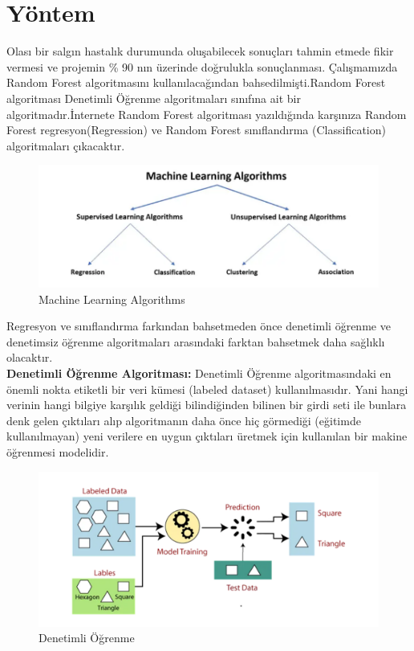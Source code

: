 \documentclass[12pt, a4paper]{article}
\begin{document}
	\section{Yöntem}
	Olası bir salgın hastalık durumunda oluşabilecek sonuçları tahmin etmede fikir vermesi ve
	projemin \% 90 nın üzerinde doğrulukla sonuçlanması.
	\newpage
	Çalışmamızda Random Forest algoritmasını kullanılacağından bahsedilmişti.Random Forest algoritması Denetimli Öğrenme algoritmaları sınıfına ait bir algoritmadır.İnternete Random Forest algoritması yazıldığında karşınıza Random Forest regresyon(Regression) ve Random Forest sınıflandırma (Classification) algoritmaları çıkacaktır.
	\begin{figure}[!htbp] 
		\caption{ Machine Learning Algorithms }
		\centering
		\includegraphics[angle=0, width=\textwidth]{resim3.png}
		
	\end{figure} 
	\newline Regresyon ve sınıflandırma farkından bahsetmeden önce denetimli öğrenme ve denetimsiz öğrenme algoritmaları arasındaki farktan bahsetmek daha sağlıklı olacaktır.\\
	\textbf{Denetimli Öğrenme Algoritması:} Denetimli Öğrenme algoritmasındaki en önemli nokta etiketli bir veri kümesi (labeled dataset) kullanılmasıdır. Yani hangi verinin hangi bilgiye karşılık geldiği bilindiğinden bilinen bir girdi seti ile bunlara denk gelen çıktıları alıp algoritmanın daha önce hiç görmediği (eğitimde kullanılmayan) yeni verilere en uygun çıktıları üretmek için kullanılan bir makine öğrenmesi modelidir.\cite{site2}
	\newpage
	\begin{figure}[!htbp] 
		\caption{ Denetimli Öğrenme  }
		\centering
		\includegraphics[angle=0, width=\textwidth]{resim1.png}
		
	\end{figure} 
	
\end{document}

